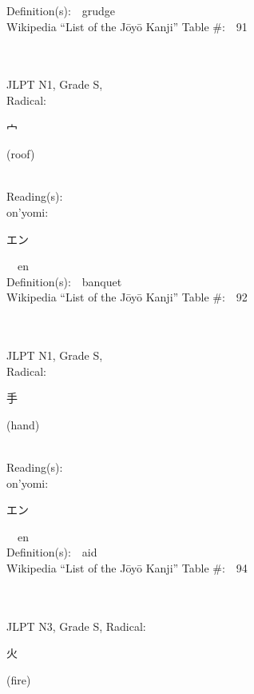 \begin{multicols}{2}
Definition(s):\ \ grudge \\
Wikipedia ``List of the J\=oy\=o Kanji'' Table \#:\ \ 91 \\
\ \ \\
{\fontsize{34pt}{40pt}  }\ \ \\
{JLPT N1, Grade S, \\Radical:\ \ {\begin{CJK}{UTF8}{min} 宀 \end{CJK}} (roof) } \\
Reading(s):\ \ \\
{\hspace*{1em}}on'yomi:\ \ \\
{\hspace*{2em}}{\begin{CJK}{UTF8}{min} エン \end{CJK}}\ \ en\ \ \\
Definition(s):\ \ banquet \\
Wikipedia ``List of the J\=oy\=o Kanji'' Table \#:\ \ 92 \\
\ \ \\
{\fontsize{34pt}{40pt}  }\ \ \\
{JLPT N1, Grade S, \\Radical:\ \ {\begin{CJK}{UTF8}{min} 手 \end{CJK}} (hand) } \\
Reading(s):\ \ \\
{\hspace*{1em}}on'yomi:\ \ \\
{\hspace*{2em}}{\begin{CJK}{UTF8}{min} エン \end{CJK}}\ \ en\ \ \\
Definition(s):\ \ aid \\
Wikipedia ``List of the J\=oy\=o Kanji'' Table \#:\ \ 94 \\
\ \ \\
{\fontsize{34pt}{40pt}  }\ \ \\  %
{JLPT N3, Grade S, Radical:\ \ {\begin{CJK}{UTF8}{min} 火 \end{CJK}} (fire) } \\

\end{multicols}
